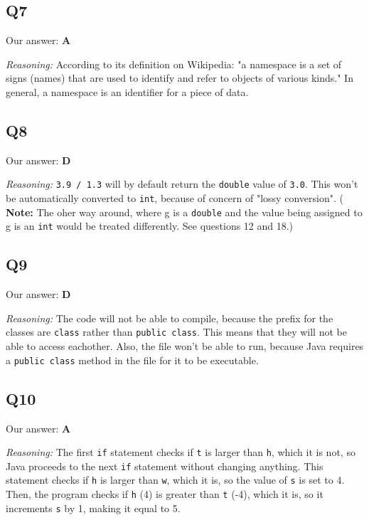 \documentclass{article}
\begin{document}
\subsection{Q7}

Our answer: \textbf{A}

\textit{Reasoning:} According to its definition on Wikipedia:
"a namespace is a set of signs (names) that are used to identify and refer to objects of various kinds." In general, a namespace is an identifier for a piece of data.

\subsection{Q8}

Our answer: \textbf{D}

\noindent\textit{Reasoning:} \verb|3.9 / 1.3| will by default return the \verb|double| value of \verb|3.0|. This won't be automatically converted to \verb|int|, because of concern of "lossy conversion". ( \textbf{Note:} The oher way around, where g is a \verb|double| and the value being assigned to g is an \verb|int| would be treated differently. See questions 12 and 18.)

\subsection{Q9}

Our answer: \textbf{D}

\noindent\textit{Reasoning:} The code will not be able to compile, because the prefix for the classes are \verb|class| rather than \verb|public class|. This means that they will not be able to access eachother. Also, the file won't be able to run, because Java requires a \verb|public class| method in the file for it to be executable. 

\subsection{Q10}

Our answer: \textbf{A}

\noindent\textit{Reasoning:} The first \verb|if| statement checks if \verb|t| is larger than \verb|h|, which it is not, so Java proceeds to the next  \verb|if| statement without changing anything. This statement checks if \verb|h| is larger than \verb|w|, which it is, so the value of \verb|s| is set to 4. Then, the program checks if \verb|h| (4) is greater than \verb|t| (-4), which it is, so it increments \verb|s| by 1, making it equal to 5.
\end{document}
